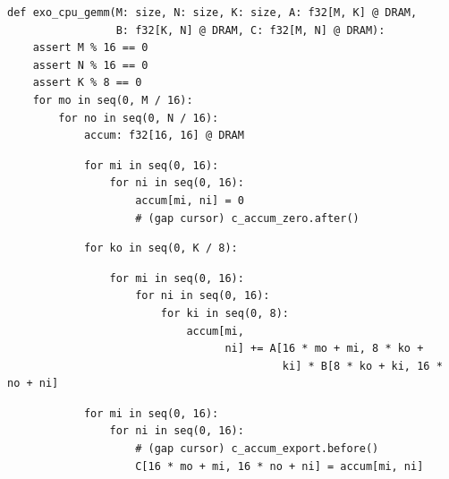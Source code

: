 \begin{minipage}[t]{0.5\textwidth}\codeminipage
\tiny
\begin{verbatim}
def exo_cpu_gemm(M: size, N: size, K: size, A: f32[M, K] @ DRAM,
                 B: f32[K, N] @ DRAM, C: f32[M, N] @ DRAM):
    assert M % 16 == 0
    assert N % 16 == 0
    assert K % 8 == 0
    for mo in seq(0, M / 16):
        for no in seq(0, N / 16):
            accum: f32[16, 16] @ DRAM
\end{verbatim}
\begin{mdframed}[style=MyFrame, backgroundcolor=yellowBoxBg]
\color{yellowBoxFg}
\begin{verbatim}
            for mi in seq(0, 16):
                for ni in seq(0, 16):
                    accum[mi, ni] = 0
                    # (gap cursor) c_accum_zero.after()
\end{verbatim}
\end{mdframed}
\begin{mdframed}[style=MyFrame, backgroundcolor=violetBoxBg]
\color{violetBoxFg}
\begin{verbatim}
            for ko in seq(0, K / 8):
\end{verbatim}
\end{mdframed}
\begin{mdframed}[style=MyFrame, backgroundcolor=blueBoxBg]
\color{blueBoxFg}
\begin{verbatim}
                for mi in seq(0, 16):
                    for ni in seq(0, 16):
                        for ki in seq(0, 8):
                            accum[mi,
                                  ni] += A[16 * mo + mi, 8 * ko +
                                           ki] * B[8 * ko + ki, 16 * no + ni]
\end{verbatim}
\end{mdframed}
\begin{mdframed}[style=MyFrame, backgroundcolor=greenBoxBg]
\color{greenBoxFg}
\begin{verbatim}
            for mi in seq(0, 16):
                for ni in seq(0, 16):
                    # (gap cursor) c_accum_export.before()
                    C[16 * mo + mi, 16 * no + ni] = accum[mi, ni]
\end{verbatim}
\end{mdframed}
\end{minipage}
\hfill
